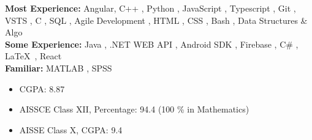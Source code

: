 
\textbf{Most Experience:}
Angular,  C++ ,  Python ,  JavaScript , Typescript ,  Git ,  VSTS ,  C ,  SQL , Agile Development ,  HTML ,  CSS ,  Bash ,  Data Structures \& Algo \\
\textbf{Some Experience:}
Java ,  .NET WEB API ,  Android SDK ,  Firebase ,  C\# ,  \LaTeX\  ,  React\\
\textbf{Familiar:}
MATLAB ,  SPSS 



%
%
%
%
%


\begin{itemize}
\item  CGPA: 8.87
\end{itemize}

\sidedivider

\begin{itemize}
\item AISSCE Class XII, Percentage: 94.4 (100 \% in Mathematics)
\item AISSE Class X, CGPA: 9.4
\end{itemize}
%
%
%
%
%



